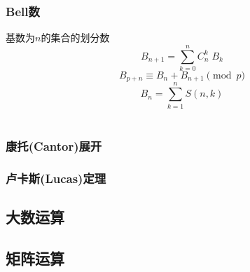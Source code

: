 \subsubsection{Bell数}
基数为$n$的集合的划分数
\begin{displaymath}
B_{n+1} = \sum_{k=0}^{n} C_{n}^{k}\;B_{k}
\end{displaymath}
\begin{displaymath}
B_{p+n} \equiv B_{n} + B_{n+1} \pmod p
\end{displaymath}
\begin{displaymath}
B_{n} = \sum_{k=1}^{n} S(n, k)
\end{displaymath}\\

\subsubsection{康托(Cantor)展开}

\subsubsection{卢卡斯(Lucas)定理}

\subsection{大数运算}

\subsection{矩阵运算}
